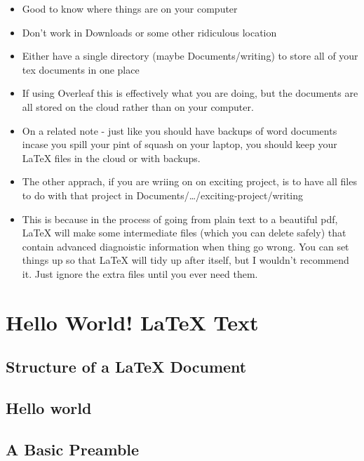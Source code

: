 \documentclass[
]{book}
\providecommand{\tightlist}{%
  \setlength{\itemsep}{0pt}\setlength{\parskip}{0pt}}
\begin{document}
\begin{itemize}
\tightlist
\item
  Good to know where things are on your computer
\item
  Don't work in Downloads or some other ridiculous location
\item
  Either have a single directory (maybe Documents/writing) to store all of your tex documents in one place
\item
  If using Overleaf this is effectively what you are doing, but the documents are all stored on the cloud rather than on your computer.
\item
  On a related note - just like you should have backups of word documents incase you spill your pint of squash on your laptop, you should keep your LaTeX files in the cloud or with backups.
\item
  The other apprach, if you are wriing on on exciting project, is to have all files to do with that project in Documents/\ldots/exciting-project/writing
\item
  This is because in the process of going from plain text to a beautiful pdf, LaTeX will make some intermediate files (which you can delete safely) that contain advanced diagnoistic information when thing go wrong. You can set things up so that LaTeX will tidy up after itself, but I wouldn't recommend it. Just ignore the extra files until you ever need them.
\end{itemize}

\hypertarget{text}{%
\chapter{Hello World! LaTeX Text}\label{text}}

\hypertarget{structure-of-a-latex-document}{%
\section{Structure of a LaTeX Document}\label{structure-of-a-latex-document}}

\hypertarget{hello-world}{%
\section{Hello world}\label{hello-world}}

\hypertarget{a-basic-preamble}{%
\section{A Basic Preamble}\label{a-basic-preamble}}
\end{document}
